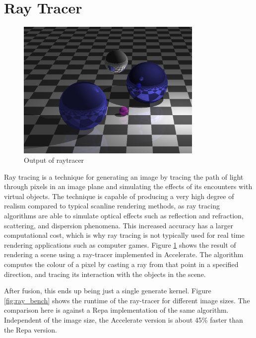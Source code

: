 \documentclass[a4paper,bibliography=totocnumbered,parskip,headsepline]{scrbook}
\begin{document}
\section{Ray Tracer}
\begin{figure}
    \centering
    \includegraphics[width=0.8\textwidth]{images/benchmarks/ray/ray_sample}
    \caption[Ray tracer]{Output of raytracer}
    \label{fig:ray_sample}
\end{figure}

Ray tracing is a technique for generating an image by tracing the path of light through pixels in an image plane and simulating the effects of its encounters with virtual objects.
The technique is capable of producing a very high degree of realism compared to typical scanline rendering methods, as ray tracing algorithms are able to simulate optical effects such as reflection and refraction, scattering, and dispersion phenomena.
This increased accuracy has a larger computational cost, which is why ray tracing is not typically used for real time rendering applications such as computer games.
Figure \ref{fig:ray_sample} shows the result of rendering a scene using a ray-tracer implemented in Accelerate.
The algorithm computes the colour of a pixel by casting a ray from that point in a specified direction, and tracing its interaction with the objects in the scene.

After fusion, this ends up being just a single generate kernel.
Figure \ref{fig:ray_bench} shows the runtime of the ray-tracer for different image sizes.
The comparison here is against a Repa implementation of the same algorithm.
Independent of the image size, the Accelerate version is about 45\% faster than the Repa version.
\end{document}
